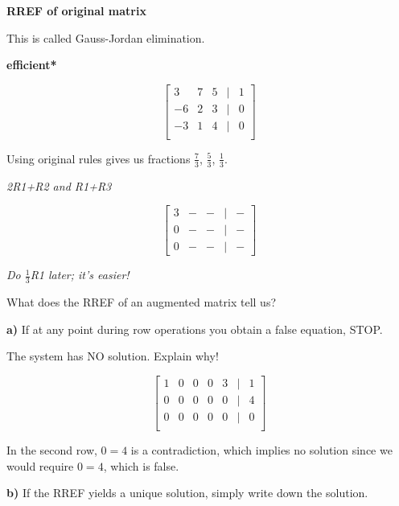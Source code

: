 \documentclass{article}
\begin{document}
\textbf{RREF of original matrix}

\medskip

This is called Gauss-Jordan elimination.

\medskip

\textbf{efficient*}

\[
\begin{bmatrix}
    3 & 7 & 5 & | & 1 \\
    -6 & 2 & 3 & | & 0 \\
    -3 & 1 & 4 & | & 0 \\
\end{bmatrix}
\]

\medskip

Using original rules gives us fractions \( \frac{7}{3} \), \( \frac{5}{3} \), \( \frac{1}{3} \).

\medskip

\textit{2R1+R2 and R1+R3}

\[
\begin{bmatrix}
    3 & - & - & | & - \\
    0 & - & - & | & - \\
    0 & - & - & | & -
\end{bmatrix}
\]

\textit{Do \( \frac{1}{3} \)R1 later; it's easier!}

\medskip

What does the RREF of an augmented matrix tell us?

\medskip

\textbf{a)} If at any point during row operations you obtain a false equation, STOP.

\medskip

The system has NO solution. Explain why!

\[
\begin{bmatrix}
    1 & 0 & 0 & 0 & 3 & | & 1 \\
    0 & 0 & 0 & 0 & 0 & | & 4 \\
    0 & 0 & 0 & 0 & 0 & | & 0 \\
\end{bmatrix}
\]

\medskip

In the second row, \(0 = 4\) is a contradiction, which implies no solution since we would require \(0 = 4\), which is false.

\medskip

\textbf{b)} If the RREF yields a unique solution, simply write down the solution.

\medskip
\end{document}
